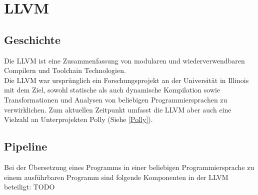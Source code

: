 \chapter{LLVM}
\section{Geschichte \cite{LLVMWebsite}\cite{LLVMResearchBeginning}\cite{IntroLLVM}}
Die \ac{LLVM} ist eine Zusammenfassung von modularen und wiederverwendbaren Compilern und Toolchain Technologien.\\
Die \ac{LLVM} war ursprünglich ein Forschungsprojekt an der Universität in Illinois mit dem Ziel, sowohl statische als auch dynamische Kompilation sowie Transformationen und Analysen von beliebigen Programmiersprachen zu verwirklichen. Zum aktuellen Zeitpunkt umfasst die \ac{LLVM} aber auch eine Vielzahl an Unterprojekten \ua Polly (Siehe \ref{Polly}).

\section{Pipeline}
Bei der Übersetzung eines Programms in einer beliebigen Programmiersprache zu einem ausführbaren Programm sind folgende Komponenten in der LLVM beteiligt:
TODO
